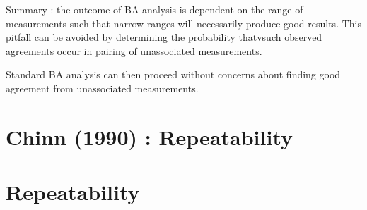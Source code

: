 \documentclass[MAIN.tex]{subfiles}
\begin{document}
Summary : the outcome of BA analysis is dependent on the range of measurements such that narrow ranges will necessarily produce good results.
This pitfall can be avoided by determining the probability thatvsuch observed agreements occur in pairing of unassociated measurements.

Standard BA analysis can then proceed without concerns about finding good agreement from unassociated measurements.



\section*{Chinn (1990) : Repeatability}

\bigskip

\section{Repeatability}
\end{document}
